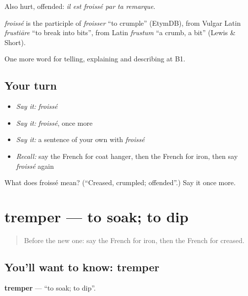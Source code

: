 Also hurt, offended: \emph{il est froissé par ta remarque}.

\begin{cousinweb}
\emph{froissé} is the participle of \emph{froisser} \textquotedblleft{}to crumple\textquotedblright{} (EtymDB), from Vulgar Latin \emph{frustiāre} \textquotedblleft{}to break into bits\textquotedblright{}, from Latin \emph{frustum} \textquotedblleft{}a crumb, a bit\textquotedblright{} (Lewis \& Short).
\end{cousinweb}

\begin{grammarlens}[title={What you've built}]
One more word for telling, explaining and describing at B1.
\end{grammarlens}

\subsection*{Your turn}
\begin{itemize}
\raggedright
  \item \emph{Say it:} \emph{froissé}
  \item \emph{Say it:} \emph{froissé}, once more
  \item \emph{Say it:} a sentence of your own with \emph{froissé}
  \item \emph{Recall:} say the French for coat hanger, then the French for iron, then say \emph{froissé} again
\end{itemize}

\begin{tcolorbox}[breakable,colback=teal!4,colframe=teal!35!black,title={Before you move on}]
What does froissé mean? (\textquotedblleft{}Creased, crumpled; offended\textquotedblright{}.) Say it once more.
\end{tcolorbox}
\section[tremper]{tremper — to soak; to dip}

\label{lesson:FR-C527-tremper}



\begin{quote}
Before the new one: say the French for iron, then the French for creased.
\end{quote}

\subsection*{You'll want to know: tremper}
\textbf{tremper} — \textquotedblleft{}to soak; to dip\textquotedblright{}.

